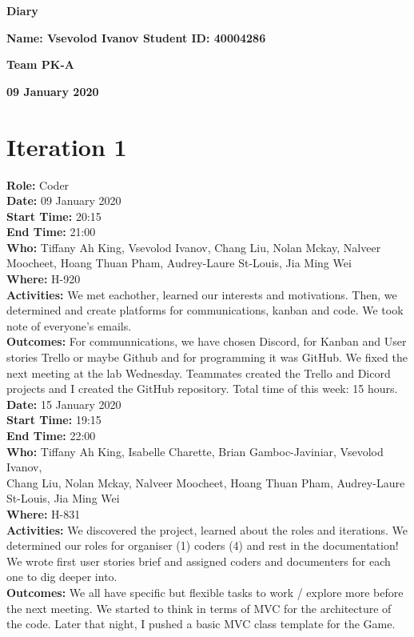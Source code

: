 \documentclass[12pt]{article}
\begin{document}
\vspace*{0.2in}
\centerline{\bf\Large Diary}

\vspace*{0.2in}
\centerline{\bf\Large Name: Vsevolod Ivanov   Student ID: 40004286}

\vspace*{0.2in}
\centerline{\bf\Large Team PK-A}

\vspace*{0.2in}
\centerline{\bf\Large 09 January 2020}

\section{Iteration 1}

{\bf Role:} Coder\\

{\bf Date:} 09 January 2020\\
{\bf Start Time:} 20:15\\
{\bf End Time:} 21:00 \\
{\bf Who:} Tiffany Ah King, Vsevolod Ivanov, Chang Liu, Nolan Mckay, Nalveer Moocheet, Hoang Thuan Pham, Audrey-Laure St-Louis, Jia Ming Wei\\
{\bf Where:} H-920 \\
{\bf Activities:} We met eachother, learned our interests and motivations. Then, we determined and create platforms for communications, kanban and code. We took note of everyone's emails.\\
{\bf Outcomes:} For communnications, we have chosen Discord, for Kanban and User stories Trello or maybe Github and for programming it was GitHub. We fixed the next meeting at the lab Wednesday. Teammates created the Trello and Dicord projects and I created the GitHub repository. Total time of this week: 15 hours.\\

{\bf Date:} 15 January 2020\\
{\bf Start Time:} 19:15\\
{\bf End Time:} 22:00\\
{\bf Who:} Tiffany Ah King, Isabelle Charette, Brian Gamboc-Javiniar, Vsevolod Ivanov,\\
Chang Liu, Nolan Mckay, Nalveer Moocheet, Hoang Thuan Pham, Audrey-Laure St-Louis, Jia Ming Wei\\
{\bf Where:} H-831\\
{\bf Activities:} We discovered the project, learned about the roles and iterations. We determined our roles for organiser (1) coders (4) and rest in the documentation! We wrote first user stories brief and assigned coders and documenters for each one to dig deeper into.\\
{\bf Outcomes:} We all have specific but flexible tasks to work / explore more before the next meeting. We started to think in terms of MVC for the architecture of the code. Later that night, I pushed a basic MVC class template for the Game.\\\\
\end{document}
